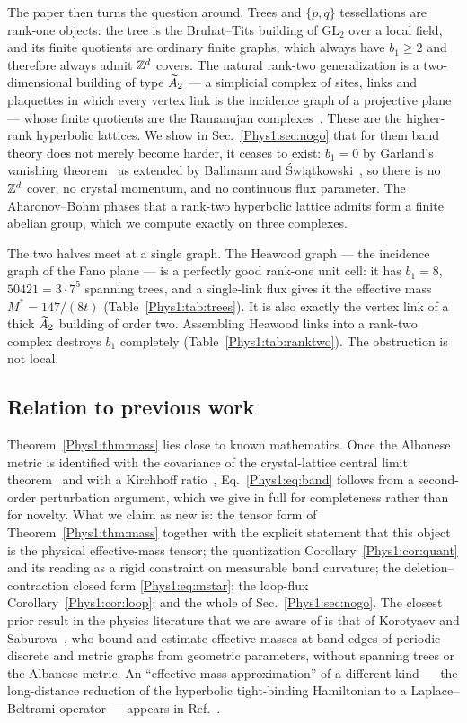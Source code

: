The paper then turns the question around. Trees and $\{p,q\}$ tessellations are rank-one
objects: the tree is the Bruhat--Tits building of $\mathrm{GL}_2$ over a local field, and
its finite quotients are ordinary finite graphs, which always have $b_1\ge2$ and therefore
always admit $\mathbb{Z}^{d}$ covers. The natural rank-two generalization is a two-dimensional
building of type $\widetilde A_2$ --- a simplicial complex of sites, links and plaquettes in which
every vertex link is the incidence graph of a projective plane --- whose finite quotients
are the Ramanujan complexes~\cite{LSV}. These are the higher-rank hyperbolic lattices. We
show in Sec.~\ref{Phys1:sec:nogo} that for them band theory does not merely become harder, it
ceases to exist: $b_1=0$ by Garland's vanishing theorem~\cite{Ga} as extended by Ballmann
and \'Swi\k{a}tkowski~\cite{BSw}, so there is no $\mathbb{Z}^{d}$ cover, no crystal momentum, and no
continuous flux parameter. The Aharonov--Bohm phases that a rank-two hyperbolic lattice
admits form a finite abelian group, which we compute exactly on three complexes.

The two halves meet at a single graph. The Heawood graph --- the incidence graph of the
Fano plane --- is a perfectly good rank-one unit cell: it has $b_1=8$, $50421=3\cdot7^{5}$
spanning trees, and a single-link flux gives it the effective mass $M^{*}=147/(8t)$
(Table~\ref{Phys1:tab:trees}). It is also exactly the vertex link of a thick $\widetilde A_2$ building of
order two. Assembling Heawood links into a rank-two complex destroys $b_1$ completely
(Table~\ref{Phys1:tab:ranktwo}). The obstruction is not local.

\subsection*{Relation to previous work}

Theorem~\ref{Phys1:thm:mass} lies close to known mathematics. Once the Albanese metric is
identified with the covariance of the crystal-lattice central limit theorem~\cite{KS1} and
with a Kirchhoff ratio~\cite{KS3,BF}, Eq.~\eqref{Phys1:eq:band} follows from a second-order
perturbation argument, which we give in full for completeness rather than for novelty. What
we claim as new is: the tensor form of Theorem~\ref{Phys1:thm:mass} together with the explicit
statement that this object is the physical effective-mass tensor; the quantization
Corollary~\ref{Phys1:cor:quant} and its reading as a rigid constraint on measurable band
curvature; the deletion--contraction closed form \eqref{Phys1:eq:mstar}; the loop-flux
Corollary~\ref{Phys1:cor:loop}; and the whole of Sec.~\ref{Phys1:sec:nogo}. The closest prior result in
the physics literature that we are aware of is that of Korotyaev and Saburova~\cite{KorS},
who bound and estimate effective masses at band edges of periodic discrete and metric
graphs from geometric parameters, without spanning trees or the Albanese metric. An
``effective-mass approximation'' of a different kind --- the long-distance reduction of the
hyperbolic tight-binding Hamiltonian to a Laplace--Beltrami operator --- appears
in Ref.~.

